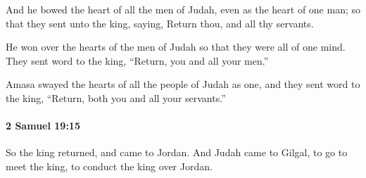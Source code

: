 			\begin{versebox}
					\item[BHS] 
					\item[ASV] And he bowed the heart of all the men of Judah, even as the heart of one man; so that they sent unto the king, saying, Return thou, and all thy servants.
					\item[NIV] He won over the hearts of the men of Judah so that they were all of one mind. They sent word to the king, “Return, you and all your men.”
					\item[NRSV] Amasa swayed the hearts of all the people of Judah as one, and they sent word to the king, “Return, both you and all your servants.”
			\end{versebox}

		\paragraph{2 Samuel 19:15} %
			\label{2SAMUEL-19-15}

			So the king returned, and came to Jordan. And Judah came to Gilgal, to go to meet the king, to conduct the king over Jordan.

